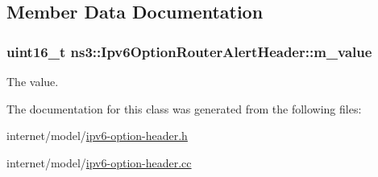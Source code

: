 \subsection{Member Data Documentation}
\subsubsection[{\texorpdfstring{m\+\_\+value}{m_value}}]{\setlength{\rightskip}{0pt plus 5cm}uint16\+\_\+t ns3\+::\+Ipv6\+Option\+Router\+Alert\+Header\+::m\+\_\+value\hspace{0.3cm}{\ttfamily [private]}}\hypertarget{classns3_1_1Ipv6OptionRouterAlertHeader_a69b5dedb17e3754989f85ee3b433580d}{}\label{classns3_1_1Ipv6OptionRouterAlertHeader_a69b5dedb17e3754989f85ee3b433580d}


The value. 



The documentation for this class was generated from the following files\+:\begin{DoxyCompactItemize}
\item 
internet/model/\hyperlink{ipv6-option-header_8h}{ipv6-\/option-\/header.\+h}\item 
internet/model/\hyperlink{ipv6-option-header_8cc}{ipv6-\/option-\/header.\+cc}\end{DoxyCompactItemize}
